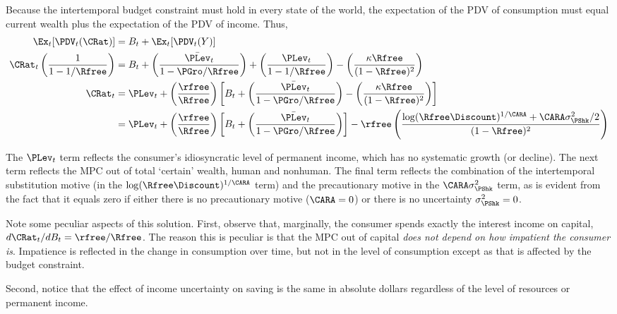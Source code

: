\documentclass{handout}
\begin{document}
Because the intertemporal budget constraint must hold in every state 
of the world, the expectation of the PDV of consumption must equal current
wealth plus the expectation of the PDV of income.  Thus,
\begin{equation}\begin{gathered}\begin{aligned}
        \Ex_{t}[\PDV_{t}(\CRat)] & =  B_{t}+\Ex_{t}[\PDV_{t}(Y)  ]
\\ \CRat_{t}\left(\frac{1}{1-1/\Rfree}\right)    & =  B_{t}+ \left(\frac{\bar{\PLev}_{t}}{1-\PGro/\Rfree}\right)+\left(\frac{ \PLev_{t}}{1-1/\Rfree}\right)-\left(\frac{\kappa \Rfree}{(1-\Rfree)^{2}}\right) 
\\ \CRat_{t}        & =  \PLev_{t} + \left(\frac{\rfree}{\Rfree}\right)\left[ B_{t}+ \left(\frac{\bar{\PLev}_{t}}{1-\PGro/\Rfree}\right)-\left(\frac{\kappa \Rfree}{(1-\Rfree)^{2}}\right)  \right]
\\ & =  \PLev_{t} + \left(\frac{\rfree}{\Rfree}\right)\left[ B_{t}+ \left(\frac{\bar{\PLev}_{t}}{1-\PGro/\Rfree}\right)\right] -\rfree\left(\frac{\log (\Rfree\Discount)^{1/\CARA} + \CARA \sigma^{2}_{\PShk}/2 }{(1-\Rfree)^{2}}\right)  \nonumber
\end{aligned}\end{gathered}\end{equation}

The $\PLev_{t}$ term reflects the consumer's idiosyncratic level of 
permanent income, which has no systematic growth (or decline).  The 
next term reflects the MPC out of total `certain' wealth, human and 
nonhuman.  The final term reflects the combination of the 
intertemporal substitution motive (in the $\log (\Rfree\Discount)^{1/\CARA}$ 
term) and the precautionary motive in the $\CARA 
\sigma^{2}_{\PShk}$ term, as is evident from the fact that it 
equals zero if either there is no precautionary motive ($\CARA=0$) or 
there is no uncertainty $\sigma^{2}_{\PShk}=0$.

Note some peculiar aspects of this solution.  First, observe that, marginally, the 
consumer spends exactly the interest income on capital, $d \CRat_{t}/d 
B_{t} = \rfree/\Rfree$.  The reason this is peculiar is that the MPC out of 
capital {\it does not depend on how impatient the consumer is}.  
Impatience is reflected in the change in consumption over time, but 
not in the level of consumption except as that is affected by the 
budget constraint.

Second, notice that the effect of income uncertainty on saving is the 
same in absolute dollars regardless of the level of resources or 
permanent income.


\end{document}
